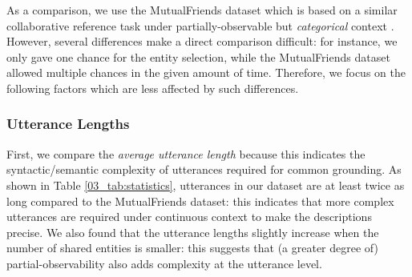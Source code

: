 As a comparison, we use the MutualFriends dataset which is based on a similar collaborative reference task under partially-observable but \emph{categorical} context \citep{he2017learning}. However, several differences make a direct comparison difficult: for instance, we only gave one chance for the entity selection, while the MutualFriends dataset allowed multiple chances in the given amount of time. Therefore, we focus on the following factors which are less affected by such differences.

\subsubsection{Utterance Lengths}

\begin{table}[ht]
\centering {}
\caption{\label{03_tab:statistics}
Basic statistics of our dataset and the MutualFriends dataset \citep{he2017learning}. To count tokens and vocabulary size, we preprocessed the text with the same NLTK word tokenizer \citep{nltkbook} and converted each token to its lowercased form. ($^*$ denotes where direct comparison is not suitable due to the task difference.)
}
\end{table}

First, we compare the \emph{average utterance length} because this indicates the syntactic/semantic complexity of utterances required for common grounding. As shown in Table \ref{03_tab:statistics}, utterances in our dataset are at least twice as long compared to the MutualFriends dataset: this indicates that more complex utterances are required under continuous context to make the descriptions precise. We also found that the utterance lengths slightly increase when the number of shared entities is smaller: this suggests that (a greater degree of) partial-observability also adds complexity at the utterance level.

